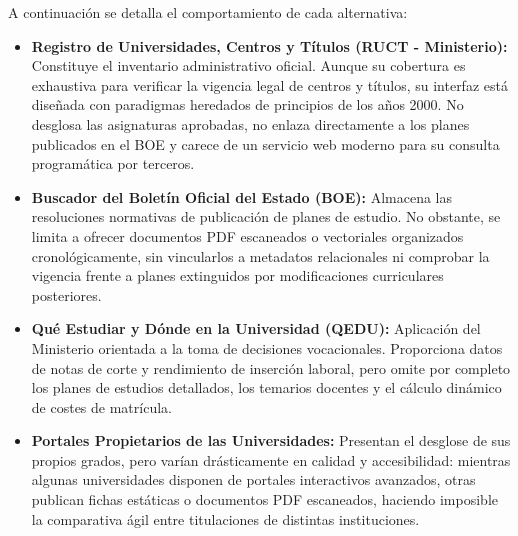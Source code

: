 \noindent A continuación se detalla el comportamiento de cada alternativa:
\begin{itemize}
    \item \textbf{Registro de Universidades, Centros y Títulos (RUCT - Ministerio):} Constituye el inventario administrativo oficial. Aunque su cobertura es exhaustiva para verificar la vigencia legal de centros y títulos, su interfaz está diseñada con paradigmas heredados de principios de los años 2000. No desglosa las asignaturas aprobadas, no enlaza directamente a los planes publicados en el BOE y carece de un servicio web moderno para su consulta programática por terceros.
    \item \textbf{Buscador del Boletín Oficial del Estado (BOE):} Almacena las resoluciones normativas de publicación de planes de estudio. No obstante, se limita a ofrecer documentos PDF escaneados o vectoriales organizados cronológicamente, sin vincularlos a metadatos relacionales ni comprobar la vigencia frente a planes extinguidos por modificaciones curriculares posteriores.
    \item \textbf{Qué Estudiar y Dónde en la Universidad (QEDU):} Aplicación del Ministerio orientada a la toma de decisiones vocacionales. Proporciona datos de notas de corte y rendimiento de inserción laboral, pero omite por completo los planes de estudios detallados, los temarios docentes y el cálculo dinámico de costes de matrícula.
    \item \textbf{Portales Propietarios de las Universidades:} Presentan el desglose de sus propios grados, pero varían drásticamente en calidad y accesibilidad: mientras algunas universidades disponen de portales interactivos avanzados, otras publican fichas estáticas o documentos PDF escaneados, haciendo imposible la comparativa ágil entre titulaciones de distintas instituciones.
\end{itemize}

